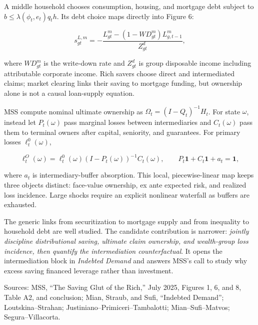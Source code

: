 A middle household chooses consumption, housing, and mortgage debt subject to
$b\leq\lambda(\phi_t,e_t)q_t h$. Its debt choice maps directly into Figure 6:

\begin{equation*}
 s^{L,m}_{gt}=-\frac{L^m_{gt}-(1-WD^m_{gt})L^m_{g,t-1}}{Z^d_{gt}},
\end{equation*}

where $WD^m_{gt}$ is the write-down rate and $Z^d_{gt}$ is group disposable
income including attributable corporate income. Rich savers choose direct and
intermediated claims; market clearing links their saving to mortgage funding,
but ownership alone is not a causal loan-supply equation.


MSS compute nominal ultimate ownership as
$\Omega_t=(I-Q_t)^{-1}H_t$. For state $\omega$, instead let $P_t(\omega)$ pass
marginal losses between intermediaries and $C_t(\omega)$ pass them to terminal
owners after capital, seniority, and guarantees. For primary losses
$\ell_t^0(\omega)$,

\begin{equation*}
 \ell_t^O(\omega)=\ell_t^0(\omega)
 (I-P_t(\omega))^{-1}C_t(\omega),
 \qquad
 P_t\mathbf 1+C_t\mathbf 1+a_t=\mathbf 1,
\end{equation*}

where $a_t$ is intermediary-buffer absorption. This local, piecewise-linear
map keeps three objects distinct: face-value ownership, ex ante expected risk,
and realized loss incidence. Large shocks require an explicit nonlinear
waterfall as buffers are exhausted.


The generic links from securitization to mortgage supply and from inequality
to household debt are well studied. The candidate contribution is narrower:
\emph{jointly discipline distributional saving, ultimate claim ownership, and
wealth-group loss incidence, then quantify the intermediation counterfactual}.
It opens the intermediation block in \emph{Indebted Demand} and answers MSS's
call to study why excess saving financed leverage rather than investment.

\vfill
{\color{MSSGray}\scriptsize
Sources: MSS, ``The Saving Glut of the Rich,'' July 2025, Figures 1, 6, and 8,
Table A2, and conclusion; Mian, Straub, and Sufi, ``Indebted Demand'';
Loutskina--Strahan; Justiniano--Primiceri--Tambalotti; Mian--Sufi--Matvos;
Segura--Villacorta.}

